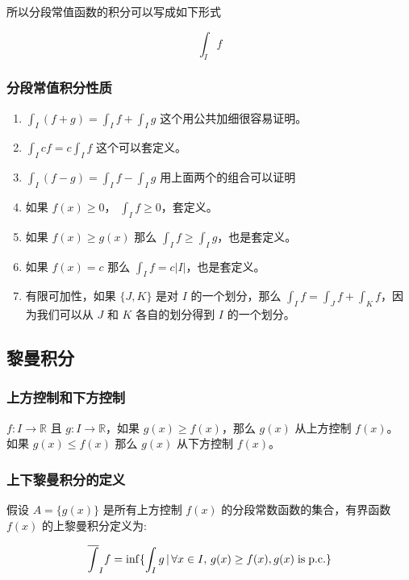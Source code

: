 所以分段常值函数的积分可以写成如下形式

\[
\int_{I} f
\]

\subsubsection{分段常值积分性质}

\begin{enumerate}
    \item $\int_{I} (f + g) = \int_{I} f + \int_{I} g$ 这个用公共加细很容易证明。
    \item $\int_{I} cf = c\int_{I} f$ 这个可以套定义。
    \item $\int_{I} (f - g) = \int_{I} f - \int_{I} g$ 用上面两个的组合可以证明
    \item 如果 $f(x) \ge 0$， $\int_{I} f \ge 0$，套定义。
    \item 如果 $f(x) \ge g(x)$ 那么 $\int_{I} f \ge \int_{I}g $，也是套定义。
    \item 如果 $f(x) = c$ 那么 $\int_{I} f  = c \lvert I \rvert $，也是套定义。
    \item 有限可加性，如果 $\{J,K \}$ 是对 $I$ 的一个划分，那么 $\int_{I}f = \int_{J}f + \int_{K} f$，因为我们可以从 $J$ 和 $K$ 各自的划分得到 $I$ 的一个划分。
\end{enumerate}

\subsection{黎曼积分}

\subsubsection{上方控制和下方控制}

$f: I \to \mathbb{R}$ 且 $g: I \to \mathbb{R}$，如果 $g(x) \ge f(x)$，那么 $g(x) $ 从上方控制 $f(x)$。
如果 $g(x) \le f(x)$ 那么 $g(x)$ 从下方控制 $f(x) $。

\subsubsection{上下黎曼积分的定义}

假设 $A = \{ g(x) \}$ 是所有上方控制 $f(x)$ 的分段常数函数的集合，有界函数 $f(x)$ 的上黎曼积分定义为:

\[
   \overline{\int}_I f =  \inf \{ \int_{I} g \,\vert\, \forall x \in I ,\, g(x) \ge f(x), g(x) \mathrm{\; is\; p.c.} \}
\]

